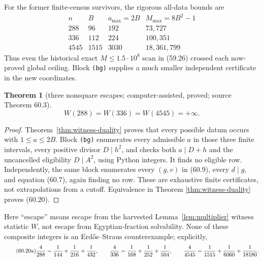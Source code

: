\documentclass[10pt,reqno]{amsart}
\newtheorem{theorem}{Theorem}[section]
\theoremstyle{definition}
\newcommand{\1}{\mathbf 1}
\begin{document}
For the former finite-census survivors, the rigorous all-data bounds are
\begin{equation}\tag{60.19}
\begin{array}{c|r|r|r}
 n&B&a_{\max}=2B&M_{\max}=8B^2-1\\ \hline
 288&96&192&73{,}727\\
 336&112&224&100{,}351\\
 4545&1515&3030&18{,}361{,}799
\end{array}
\end{equation}
Thus even the historical exact $M\leq1.5\cdot10^8$ scan in (59.26) crossed
each now-proved global ceiling.  Block \texttt{(bg)} supplies a much smaller
independent certificate in the new coordinates.

\begin{theorem}[three nonsquare escapes; computer-assisted, proved; source
Theorem 60.3]\label{thm:nonsquare-escapes}
\begin{equation}\tag{60.20}
 W(288)=W(336)=W(4545)=+\infty.
\end{equation}
\end{theorem}
\begin{proof}
Theorem~\ref{thm:witness-duality} proves that every possible datum occurs
with $1\leq a\leq2B$.  Block \texttt{(bg)} enumerates every admissible $a$
in those three finite intervals, every positive divisor $D\mid h^2$, and
checks both $a\mid D+h$ and the uncancelled eligibility $D\mid A^2$, using
Python integers.  It finds no eligible row.  Independently, the same block
enumerates every $(g,v)$ in (60.9), every $d\mid g$, and equation (60.7),
again finding no row.  These are exhaustive finite certificates, not
extrapolations from a cutoff.  Equivalence in Theorem
\ref{thm:witness-duality} proves (60.20).
\end{proof}
Here ``escape'' means escape from the harvested
Lemma~\ref{lem:multiplier} witness statistic $W$, not escape from
Egyptian-fraction solvability.  None of these composite integers is an
Erd\H{o}s--Straus counterexample; explicitly,
\begin{equation}\tag{60.20a}
 {4\over288}={1\over144}+{1\over216}+{1\over432},\qquad
 {4\over336}={1\over168}+{1\over252}+{1\over504},\qquad
 {4\over4545}={1\over1515}+{1\over6060}+{1\over18180}.
\end{equation}
\end{document}
